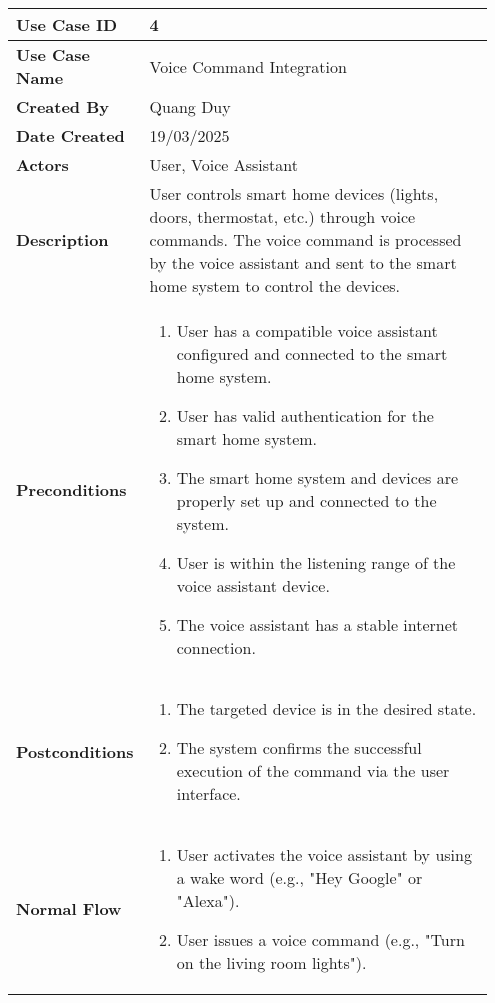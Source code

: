 \begin{longtable}{|>{\centering\arraybackslash}p{0.2\linewidth}|p{0.75\linewidth}|}
    \hline
    \textbf{Use Case ID} & 4 \\ \hline
    \textbf{Use Case Name} & Voice Command Integration \\ \hline
    \textbf{Created By} & Quang Duy \\ \hline
    \textbf{Date Created} & 19/03/2025 \\ \hline
    \textbf{Actors} & User, Voice Assistant \\ \hline
    \textbf{Description} & User controls smart home devices (lights, doors, thermostat, etc.) through voice commands. The voice command is processed by the voice assistant and sent to the smart home system to control the devices. \\ \hline
    \textbf{Preconditions} & 
    \begin{enumerate}[left=0pt,label=\arabic*.,nosep,topsep=0pt,itemsep=0pt,partopsep=0pt]
        \item User has a compatible voice assistant configured and connected to the smart home system.
        \item User has valid authentication for the smart home system.
        \item The smart home system and devices are properly set up and connected to the system.
        \item User is within the listening range of the voice assistant device.
        \item The voice assistant has a stable internet connection.
    \end{enumerate} \\ \hline
    \textbf{Postconditions} &
    \begin{enumerate}[left=0pt,label=\arabic*.,nosep,topsep=0pt,itemsep=0pt,partopsep=0pt]
        \item The targeted device is in the desired state.
        \item The system confirms the successful execution of the command via the user interface.
    \end{enumerate} \\ \hline
    \textbf{Normal Flow} &
    \begin{enumerate}[left=0pt,label=\arabic*.,nosep,topsep=0pt,itemsep=0pt,partopsep=0pt]
        \item User activates the voice assistant by using a wake word (e.g., "Hey Google" or "Alexa").
        \item User issues a voice command (e.g., "Turn on the living room lights").

\end{enumerate}
\end{longtable}
